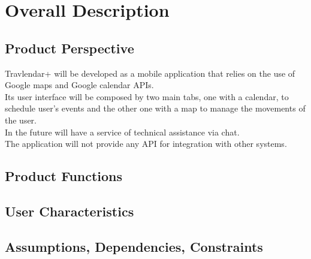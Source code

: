 %
%
\chapter{Overall Description}
%
\label{cap:overalldescription}
%
%
\section{Product Perspective}
Travlendar+ will be developed as a mobile application that relies on the use of Google maps and Google calendar APIs. \\
Its user interface will be composed by two main tabs, one with a calendar, to schedule user's events and the other one with a map to manage the movements of the user. \\
In the future will have a service of technical assistance via chat. \\
The application will not provide any API for integration with other systems.
%
%
\section{Product Functions}
%
%
\section{User Characteristics}
%
%
\section{Assumptions, Dependencies, Constraints}
%
